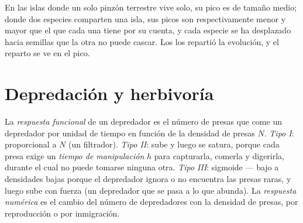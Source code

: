 \begin{example}\label{ex:b1:species-interactions:finches}
En las islas donde un solo pinzón terrestre vive solo, su pico es de tamaño
medio; donde dos especies comparten una isla, sus picos son respectivamente
menor y mayor que el que cada una tiene por su cuenta, y cada especie se ha
desplazado hacia semillas que la otra no puede cascar. Los  los
repartió la evolución, y el reparto se ve en el pico.
\end{example}

\section{Depredación y herbivoría}

\begin{definition}\label{def:b1:species-interactions:functional}
La \emph{respuesta funcional} de un depredador es el número de presas que
come un depredador por unidad de tiempo en función de la densidad de presas
$N$. \emph{Tipo I}: proporcional a $N$ (un filtrador). \emph{Tipo II}: sube
y luego se satura, porque cada presa exige un \emph{tiempo de manipulación}
$h$ para capturarla, comerla y digerirla, durante el cual no puede tomarse
ninguna otra. \emph{Tipo III}: sigmoide --- bajo a densidades bajas porque
el depredador ignora o no encuentra las presas raras, y luego sube con
fuerza (un depredador que se pasa a lo que abunda). La \emph{respuesta
numérica} es el cambio del número de depredadores con la densidad de presas,
por reproducción o por inmigración.
\end{definition}

